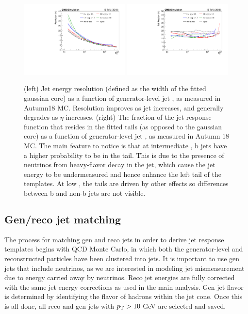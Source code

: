 \begin{figure}[htbp]
  \begin{center}
    \includegraphics[width=0.49\textwidth]{figs/jetmet/resolution_vs_pt.pdf}
    \includegraphics[width=0.49\textwidth]{figs/jetmet/tailfrac_vs_pt.pdf}
    \caption{(left) Jet energy resolution (defined as the width of the fitted gaussian core) as a function of generator-level jet \pt, as measured in Autumn18 MC. 
    Resolution improves as jet \pt increases, and generally degrades as $\eta$ increases.
    (right) The fraction of the jet response function that resides in the fitted tails (as opposed to the gaussian core) as a function of generator-level jet \pt, 
    as measured in Autumn 18 MC. The main feature to notice is that at intermediate \pt,  b jets have a higher probability to be in the tail. This is due to the presence
    of neutrinos from heavy-flavor decay in the jet, which cause the jet energy to be undermeasured and hence enhance the left tail of the templates. At low \pt, the
    tails are driven by other effects so differences between b and non-b jets are not visible.
    }
    \label{fig:jrt_res_pt}
  \end{center}
\end{figure}


\subsection{Gen/reco jet matching}
\label{sec:jrt_matching}

The process for matching gen and reco jets in order to derive jet response templates begins with QCD Monte Carlo,
in which both the generator-level and reconstructed particles have been clustered into jets.
It is important to use gen jets that include neutrinos, as we are interested in modeling jet mismeasurement due
to energy carried away by neutrinos. Reco jet energies are fully corrected with the same jet energy corrections
as used in the main analysis. Gen jet flavor is determined by identifying the flavor of 
hadrons within the jet cone. Once this is all done, all reco and gen jets with $p_{\mathrm{T}}>10$ GeV are selected and saved.

